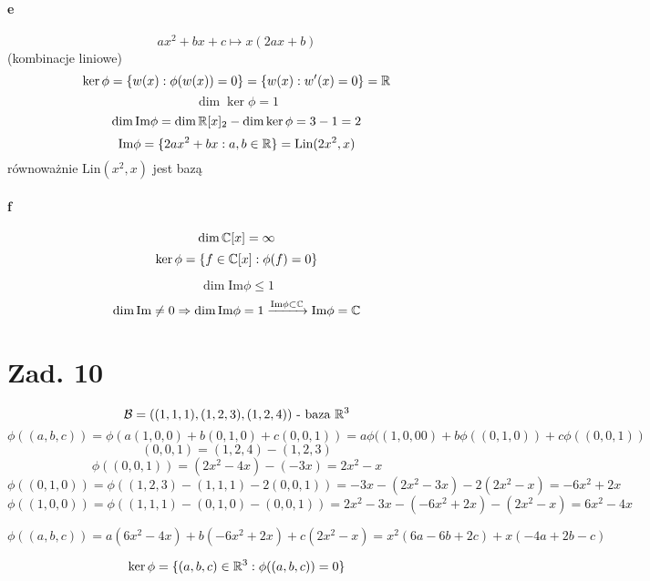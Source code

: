 \documentclass[a4paper,fleqn]{article}
\begin{document}
	\paragraph{e}
	\[ ax^2 + bx + c \mapsto x(2ax+b) \]
	(kombinacje liniowe)
	\[ \ker \phi = \{ w(x) : \phi(w(x)) = 0 \} = \{ w(x) : w'(x) = 0 \} = \mathbb{R} \]
	\[ \dim \ker \phi = 1 \]
	\[ \dim \text{Im} \phi = \dim \mathbb{R}[x]_2 - \dim \ker \phi = 3- 1 = 2 \]
	\[ \text{Im} \phi = \{ 2ax^2 + bx : a,b\in\mathbb{R} \} = \text{Lin} (2x^2,x) \]
	równoważnie $\text{Lin}(x^2,x)$ jest bazą

	\paragraph{f}
	\[ \dim \mathbb{C}[x] = \infty \]
	\[ \ker \phi = \{ f \in \mathbb{C}[x] : \phi(f) = 0 \} \]

	\[ \dim \text{Im}\phi \leqslant 1 \]
	\[ \dim \text{Im} \neq 0 \Rightarrow \dim \text{Im} \phi =
		1 \xrightarrow{\text{Im} \phi \subset \mathbb{C}}
		\text{Im} \phi = \mathbb{C} \]

	\section*{Zad. 10}
	\[ \mathcal{B} = ((1,1,1), (1,2,3), (1,2,4)) \text{ - baza } \mathbb{R}^3 \]
	\[ \phi((a,b,c)) = \phi( a(1,0,0) + b(0,1,0) + c(0,0,1)) =
		a\phi ((1,0,00) + b\phi((0,1,0)) + c\phi((0,0,1)) \]
	\[ (0,0,1) = (1,2,4) - (1,2,3) \]
	\[ \phi((0,0,1)) = (2x^2 - 4x) - (-3x) = 2x^2 - x \]
	\[ \phi((0,1,0)) = \phi((1,2,3) - (1,1,1) -2(0,0,1)) =
		-3x-(2x^2-3x)-2(2x^2-x) = -6x^2 + 2x \]
	\[ \phi((1,0,0)) = \phi ((1,1,1)-(0,1,0)-(0,0,1)) =
		2x^2 - 3x - (-6x^2+2x) - (2x^2-x) = 6x^2-4x \]

	\[ \phi((a,b,c)) = a(6x^2 - 4x) + b(-6x^2 + 2x) + c(2x^2-x) =
		x^2(6a-6b+2c) + x(-4a + 2b - c) \]

	\[ \ker \phi = \{ (a,b,c)\in\mathbb{R}^3: \phi ((a,b,c)) = 0 \} \]
\end{document}
